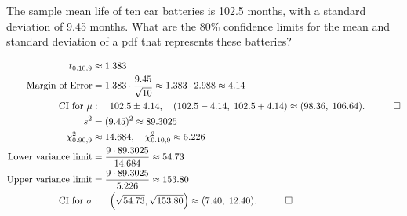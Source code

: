 \begin{hwkProblem}{3}{}

	The sample mean life of ten car batteries is 102.5 months, with a standard deviation of 9.45 months. What are the 80\% confidence limits for the mean and standard deviation of a pdf that represents these batteries?

	\hwkSol

	\begin{align*}
		t_{0.10,9} &\approx 1.383 \\
		\text{Margin of Error} &= 1.383 \cdot \frac{9.45}{\sqrt{10}} \approx 1.383 \cdot 2.988 \approx 4.14 \\
		\text{CI for } \mu &: \quad 102.5 \pm 4.14,\quad (102.5-4.14,\;102.5+4.14) \approx (98.36,\;106.64). \quad \qed \\
		s^2 &= (9.45)^2 \approx 89.3025 \\
		\chi^2_{0.90,9} &\approx 14.684,\quad \chi^2_{0.10,9} \approx 5.226 \\
		\text{Lower variance limit} &= \frac{9 \cdot 89.3025}{14.684} \approx 54.73 \\
		\text{Upper variance limit} &= \frac{9 \cdot 89.3025}{5.226} \approx 153.80 \\
		\text{CI for } \sigma &: \quad \left(\sqrt{54.73},\sqrt{153.80}\right) \approx (7.40,\;12.40). \quad \qed
	\end{align*}

\end{hwkProblem}

